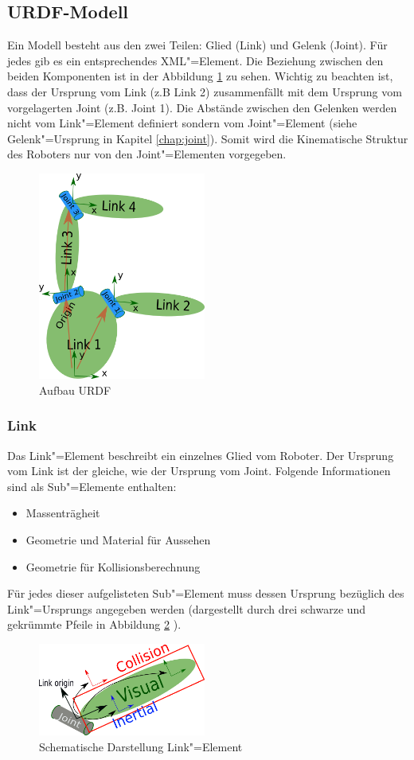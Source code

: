 \subsection{URDF-Modell}
\label{urdf-modell}
Ein Modell besteht aus den zwei Teilen: Glied (Link) und Gelenk (Joint).
Für jedes gib es ein entsprechendes XML"=Element.
Die Beziehung zwischen den beiden Komponenten ist in der Abbildung \ref{Ab:aufbaut-urdf} zu sehen.
Wichtig zu beachten ist, dass der Ursprung vom Link (z.B Link 2) zusammenfällt mit dem Ursprung vom vorgelagerten Joint (z.B. Joint 1).
Die Abstände zwischen den Gelenken werden nicht vom Link"=Element definiert sondern vom Joint"=Element (siehe Gelenk"=Ursprung in Kapitel \ref{chap:joint}).
Somit wird die Kinematische Struktur des Roboters nur von den  Joint"=Elementen vorgegeben.

\begin{figure}[ht!]
	\centering
	\includegraphics[width=5.5cm]{images/urdf_model.png}
	\caption{Aufbau URDF \cite{ros}}
	\label{Ab:aufbaut-urdf}
\end{figure}

\subsubsection{Link}
\label{chap:link}
Das Link"=Element beschreibt ein einzelnes Glied vom Roboter.
Der Ursprung vom Link ist der gleiche, wie der Ursprung vom Joint.
Folgende Informationen sind als Sub"=Elemente enthalten: 
\begin{itemize}
\item Massenträgheit
\item Geometrie und Material für Aussehen
\item Geometrie für Kollisionsberechnung
\end{itemize}
Für jedes dieser aufgelisteten Sub"=Element muss dessen Ursprung bezüglich des Link"=Ursprungs angegeben werden (dargestellt durch drei schwarze und gekrümmte Pfeile in Abbildung \ref{Ab:aufbaut-link} ).
\begin{figure}[ht!]
	\centering
	\includegraphics[width=5.5cm]{images/urdf_link.png}
	\caption{Schematische Darstellung Link"=Element \cite{ros}}
	\label{Ab:aufbaut-link}
\end{figure}

